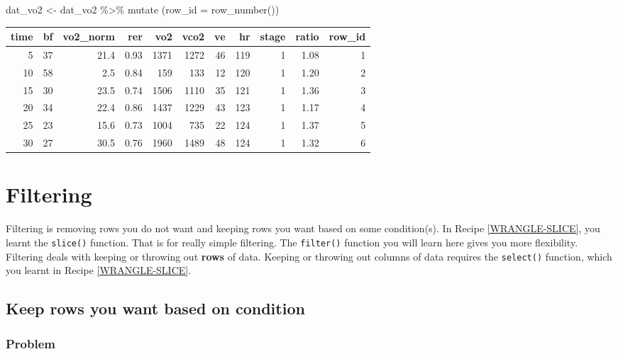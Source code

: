 \documentclass[
]{book}
\newenvironment{Shaded}{\begin{snugshade}}{\end{snugshade}}
\newcommand{\AttributeTok}[1]{\textcolor[rgb]{0.77,0.63,0.00}{#1}}
\newcommand{\FunctionTok}[1]{\textcolor[rgb]{0.00,0.00,0.00}{#1}}
\newcommand{\NormalTok}[1]{#1}
\newcommand{\OtherTok}[1]{\textcolor[rgb]{0.56,0.35,0.01}{#1}}
\newcommand{\SpecialCharTok}[1]{\textcolor[rgb]{0.00,0.00,0.00}{#1}}
\begin{document}
\begin{Shaded}
\begin{Highlighting}[]
\NormalTok{dat\_vo2 }\OtherTok{\textless{}{-}}\NormalTok{ dat\_vo2 }\SpecialCharTok{\%\textgreater{}\%}
  \FunctionTok{mutate}\NormalTok{ (}\AttributeTok{row\_id =} \FunctionTok{row\_number}\NormalTok{())}
\end{Highlighting}
\end{Shaded}

\begin{tabular}{r|r|r|r|r|r|r|r|r|r|r}
\hline
time & bf & vo2\_norm & rer & vo2 & vco2 & ve & hr & stage & ratio & row\_id\\
\hline
5 & 37 & 21.4 & 0.93 & 1371 & 1272 & 46 & 119 & 1 & 1.08 & 1\\
\hline
10 & 58 & 2.5 & 0.84 & 159 & 133 & 12 & 120 & 1 & 1.20 & 2\\
\hline
15 & 30 & 23.5 & 0.74 & 1506 & 1110 & 35 & 121 & 1 & 1.36 & 3\\
\hline
20 & 34 & 22.4 & 0.86 & 1437 & 1229 & 43 & 123 & 1 & 1.17 & 4\\
\hline
25 & 23 & 15.6 & 0.73 & 1004 & 735 & 22 & 124 & 1 & 1.37 & 5\\
\hline
30 & 27 & 30.5 & 0.76 & 1960 & 1489 & 48 & 124 & 1 & 1.32 & 6\\
\hline
\end{tabular}

\hypertarget{WRANGLE-FILTER}{%
\section{Filtering}\label{WRANGLE-FILTER}}

Filtering is removing rows you do not want and keeping rows you want based on some condition(s). In Recipe \ref{WRANGLE-SLICE}, you learnt the \texttt{slice()} function. That is for really simple filtering. The \texttt{filter()} function you will learn here gives you more flexibility. Filtering deals with keeping or throwing out \textbf{rows} of data. Keeping or throwing out columns of data requires the \texttt{select()} function, which you learnt in Recipe \ref{WRANGLE-SLICE}.

\hypertarget{WRANGLE-FILTER-KEEP-CHARACTER}{%
\subsection{Keep rows you want based on condition}\label{WRANGLE-FILTER-KEEP-CHARACTER}}

\hypertarget{problem-10}{%
\subsubsection{Problem}\label{problem-10}}
\end{document}
